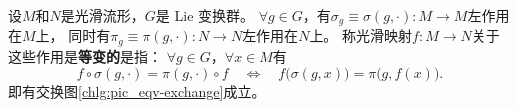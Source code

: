 %





\begin{definition}\label{chlg:def_equivariant}
    设$M$和$N$是光滑流形，$G$是 Lie 变换群。
    $\forall g\in G$，有$\sigma_g\equiv \sigma(g,\cdot): M\to M$左作用在$M$上，
    同时有$\pi_g\equiv \pi(g,\cdot):N\to N$左作用在$N$上。
    称光滑映射$f:M\to N$关于这些作用是\textbf{等变的}是指：
    $\forall g\in G$，$\forall x\in M$有
    \begin{equation}\label{chlg:eqn_equivariant}
        f\circ \sigma(g,\cdot) = \pi(g,\cdot)\circ f
        \quad \Leftrightarrow \quad
        f\bigl( \sigma(g,x) \bigr) = \pi\bigl(g, f(x)\bigr) .
    \end{equation}
    即有交换图\ref{chlg:pic_eqv-exchange}成立。
\end{definition}

